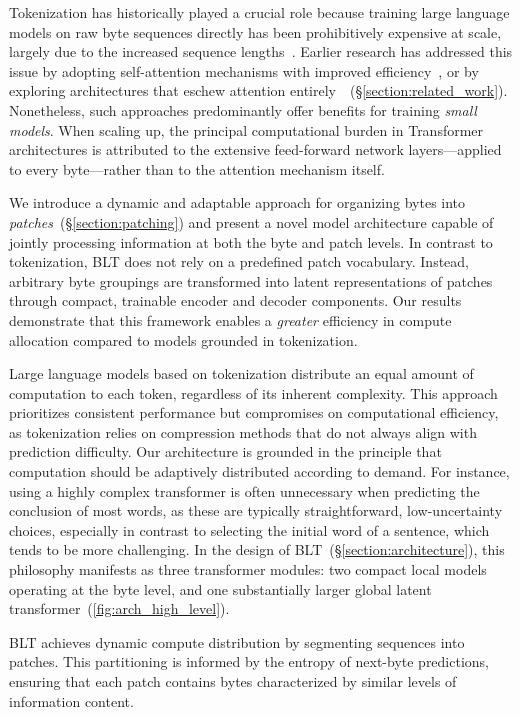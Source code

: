 Tokenization has historically played a crucial role because training large language models on raw byte sequences directly has been prohibitively expensive at scale, largely due to the increased sequence lengths~\citep{xue2022byt5}. Earlier research has addressed this issue by adopting self-attention mechanisms with improved efficiency~\citep{el2020characterbert, clark2022canine}, or by exploring architectures that eschew attention entirely~\citep{wang2024mambabyte}~(\S\ref{section:related_work}). Nonetheless, such approaches predominantly offer benefits for training \textit{small models}. When scaling up, the principal computational burden in Transformer architectures is attributed to the extensive feed-forward network layers—applied to every byte—rather than to the attention mechanism itself.

We introduce a dynamic and adaptable approach for organizing bytes into \textit{patches}~(\S\ref{section:patching}) and present a novel model architecture capable of jointly processing information at both the byte and patch levels. In contrast to tokenization, {\textsc BLT} does not rely on a predefined patch vocabulary. Instead, arbitrary byte groupings are transformed into latent representations of patches through compact, trainable encoder and decoder components. Our results demonstrate that this framework enables a \textit{greater} efficiency in compute allocation compared to models grounded in tokenization.

Large language models based on tokenization distribute an equal amount of computation to each token, regardless of its inherent complexity. This approach prioritizes consistent performance but compromises on computational efficiency, as tokenization relies on compression methods that do not always align with prediction difficulty. Our architecture is grounded in the principle that computation should be adaptively distributed according to demand. For instance, using a highly complex transformer is often unnecessary when predicting the conclusion of most words, as these are typically straightforward, low-uncertainty choices, especially in contrast to selecting the initial word of a sentence, which tends to be more challenging. In the design of {\textsc BLT}~(\S\ref{section:architecture}), this philosophy manifests as three transformer modules: two compact local models operating at the byte level, and one substantially larger global latent transformer~(\autoref{fig:arch_high_level}). 

{\textsc BLT} achieves dynamic compute distribution by segmenting sequences into patches. This partitioning is informed by the entropy of next-byte predictions, ensuring that each patch contains bytes characterized by similar levels of information content.

